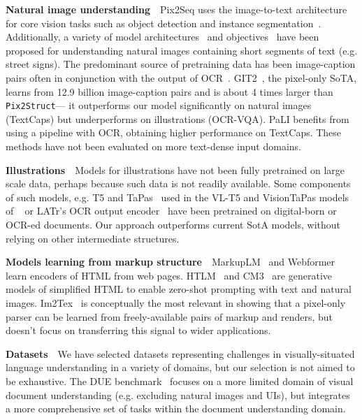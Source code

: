 \documentclass{article} \usepackage[accepted]{icml2023}
\newcommand\ourmodel{{\texttt{Pix2Struct}}}
\begin{document}
\textbf{Natural image understanding}~~Pix2Seq uses the image-to-text architecture for core vision tasks such as object detection and instance segmentation~\citep{chen2022unified,chen2021pix2seq}. Additionally, a variety of model architectures~\citep{singh2019towards,sidorov2019textcaps,wang2020multimodal} and objectives~\citep{yang2021tap} have been proposed for understanding natural images containing short segments of text (e.g. street signs). The predominant source of pretraining data has been image-caption pairs often in conjunction with the output of OCR~\citep{pali,yang2021tap}. GIT2~\citep{wang2022git}, the pixel-only SoTA, learns from 12.9 billion image-caption pairs and is about 4 times larger than \ourmodel--- it outperforms our model significantly on natural images (TextCaps) but underperforms on illustrations (OCR-VQA). PaLI benefits from using a pipeline with OCR, obtaining higher performance on TextCaps. These methods have not been evaluated on more text-dense input domains.

\textbf{Illustrations}~~Models for illustrations have not been fully pretrained on large scale data, perhaps because such data is not readily available. Some components of such models, e.g. T5 and TaPas~\citep{eisenschlos-etal-2020-understanding} used in the VL-T5 and VisionTaPas models of ~\citet{masry-etal-2022-chartqa} or LATr's OCR output encoder~\citep{biten2022latr} have been pretrained on digital-born or OCR-ed documents. Our approach outperforms current SotA models, without relying on other intermediate structures.

\textbf{Models learning from markup structure}~~MarkupLM~\citep{li2021markuplm} and Webformer~\citep{wang2022webformer} learn encoders of HTML from web pages. HTLM~\citep{aghajanyan2021htlm} and  CM3~\citep{aghajanyan2022cm3} are generative models of simplified HTML to enable zero-shot prompting with text and natural images. Im2Tex~\citep{deng2017image} is conceptually the most relevant in showing that a pixel-only parser can be learned from freely-available pairs of markup and renders, but doesn't focus on transferring this signal to wider applications.

\textbf{Datasets}~~We have selected datasets representing challenges in visually-situated language understanding in a variety of domains, but our selection is not aimed to be exhaustive. The DUE benchmark~\citep{borchmann2021due} focuses on a more limited domain of visual document understanding (e.g. excluding natural images and UIs), but integrates a more comprehensive set of tasks within the document understanding domain.
\end{document}
